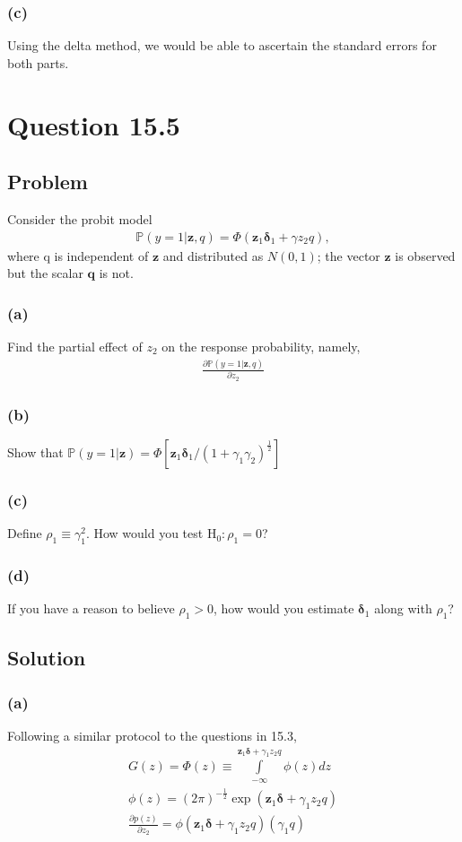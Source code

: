 \documentclass[10pt, a4paper]{article}
\newcommand{\PP}{\mathbb P}
\begin{document}
      \subsubsection*{(c)}
        Using the delta method, we would be able to ascertain the standard errors for both parts.
\section*{Question 15.5}
  \subsection*{Problem}
    Consider the probit model
    \begin{gather*}
      \PP(y=1|\textbf{z},q) = \Phi(\textbf{z}_1\boldsymbol{\delta}_1+\gamma z_2q),
    \end{gather*}
    where q is independent of $\textbf{z}$ and distributed as $N(0,1)$; the vector $\textbf{z}$ is observed but the scalar $\textbf{q}$ is not.
    \subsubsection*{(a)}
      Find the partial effect of $z_2$ on the response probability, namely,
      \begin{gather*}
        \frac{\partial\PP(y=1|\textbf{z},q)}{\partial z_2}
      \end{gather*}
    \subsubsection*{(b)}
      Show that $\PP(y=1|\textbf{z}) = \Phi[\textbf{z}_1{\boldsymbol\delta}_1/(1+\gamma_1\gamma_2)^{\frac{1}{2}}]$
    \subsubsection*{(c)}
      Define $\rho_1 \equiv \gamma_1^2$. How would you test $\text{H}_0: \rho_1=0$?
    \subsubsection*{(d)}
      If you have a reason to believe $\rho_1>0$, how would you estimate $\boldsymbol{\delta}_1$ along with $\rho_1$?
  \subsection*{Solution}
    \subsubsection*{(a)}
      Following a similar protocol to the questions in 15.3,
      \begin{gather*}
        G(z) = \Phi(z) \equiv \int\limits_{-\infty}^{\textbf{z}_1\boldsymbol{\delta}+\gamma_1z_2q}\phi(z)dz \\
        \phi(z) = (2\pi)^{-\frac{1}{2}}\exp(\textbf{z}_1\boldsymbol{\delta}+\gamma_1z_2q) \\
        \frac{\partial p(z)}{\partial z_2} = \phi(\textbf{z}_1\boldsymbol{\delta}+\gamma_1z_2q)(\gamma_1q)
      \end{gather*}
\end{document}
